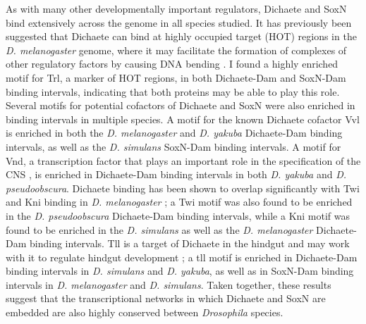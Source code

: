 As with many other developmentally important regulators, Dichaete and SoxN bind extensively across the genome in all species studied. It has previously been suggested that Dichaete can bind at highly occupied target (HOT) regions in the \emph{D. melanogaster} genome, where it may facilitate the formation of complexes of other regulatory factors by causing DNA bending \citep{aleksic_role_2013}. I found a highly enriched motif for Trl, a marker of HOT regions, in both Dichaete-Dam and SoxN-Dam binding intervals, indicating that both proteins may be able to play this role. Several motifs for potential cofactors of Dichaete and SoxN were also enriched in binding intervals in multiple species. A motif for the known Dichaete cofactor Vvl is enriched in both the \emph{D. melanogaster} and \emph{D. yakuba} Dichaete-Dam binding intervals, as well as the \emph{D. simulans} SoxN-Dam binding intervals. A motif for Vnd, a transcription factor that plays an important role in the specification of the CNS \citep{ferrero_soxneuro_2014,zhao_sox-domain_2002}, is enriched in Dichaete-Dam binding intervals in both \emph{D. yakuba} and \emph{D. pseudoobscura}. Dichaete binding has been shown to overlap significantly with Twi and Kni binding in \emph{D. melanogaster} \citep{aleksic_role_2013}; a Twi motif was also found to be enriched in the \emph{D. pseudoobscura} Dichaete-Dam binding intervals, while a Kni motif was found to be enriched in the \emph{D. simulans} as well as the \emph{D. melanogaster} Dichaete-Dam binding intervals. Tll is a target of Dichaete in the hindgut and may work with it to regulate hindgut development \citep{aleksic_role_2013}; a tll motif is enriched in Dichaete-Dam binding intervals in \emph{D. simulans} and \emph{D. yakuba}, as well as in SoxN-Dam binding intervals in \emph{D. melanogaster} and \emph{D. simulans}. Taken together, these results suggest that the transcriptional networks in which Dichaete and SoxN are embedded are also highly conserved between \emph{Drosophila} species.\\

